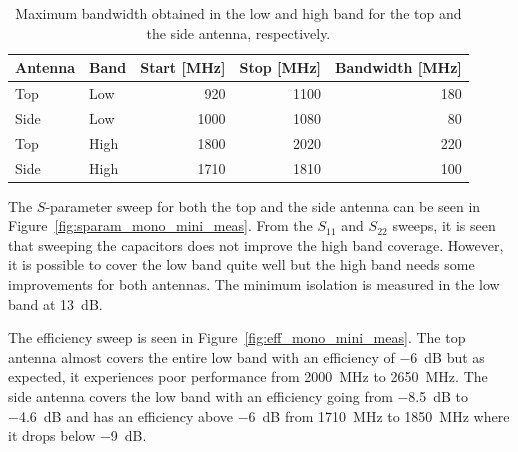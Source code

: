 \begin{table}
  \centering
  \begin{tabular}{|l|l|r|r|r|}
    \hline
    Antenna & Band & Start [MHz] & Stop [MHz] & Bandwidth [MHz] \\
    \hline
    Top     & Low  & 920         & 1100       & 180 \\
    Side    & Low  & 1000        & 1080        & 80 \\
    \hline
    Top     & High & 1800        & 2020       & 220 \\
    Side    & High & 1710        & 1810       & 100 \\
    \hline
  \end{tabular}
  \caption{Maximum bandwidth obtained in the low and high band for the top and the side antenna, respectively.}
  \label{tab:bw_mono_mini_meas}
\end{table}

The $S$-parameter sweep for both the top and the side antenna can be seen in Figure~\ref{fig:sparam_mono_mini_meas}. From the $S_{11}$ and $S_{22}$ sweeps, it is seen that sweeping the capacitors does not improve the high band coverage. However, it is possible to cover the low band quite well but the high band needs some improvements for both antennas.  
The minimum isolation is measured in the low band at \SI{13}{dB}. 

The efficiency sweep is seen in Figure~\ref{fig:eff_mono_mini_meas}. The top antenna almost covers the entire low band with an efficiency of \SI{-6}{dB} but as expected, it experiences poor performance from \SI{2000}{MHz} to \SI{2650}{MHz}. The side antenna covers the low band with an efficiency going from \SI{-8.5}{dB} to \SI{-4.6}{dB} and has an efficiency above \SI{-6}{dB} from \SI{1710}{MHz} to \SI{1850}{MHz} where it drops below \SI{-9}{dB}.

